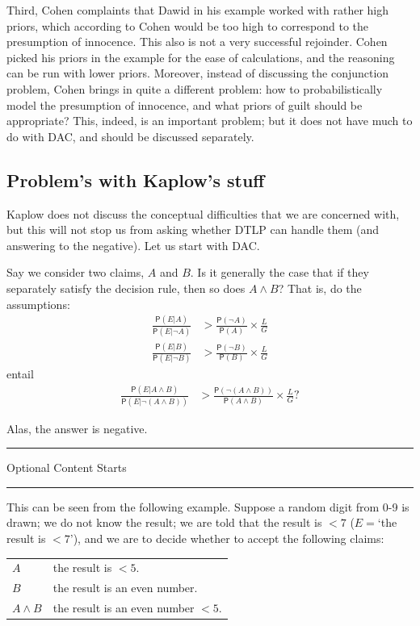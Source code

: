 \documentclass[
  10pt,
  dvipsnames,enabledeprecatedfontcommands]{scrartcl}
\newcommand{\n}{\neg}
\newcommand{\et}{\wedge}
\newcommand{\pr}[1]{\mathsf{P}(#1)}
\newcommand{\intermezzoa}{
	\begin{minipage}[c]{13cm}
	\begin{center}\rule{10cm}{0.4pt}



	\tiny{\sc Optional Content Starts}
	
	\vspace{-1mm}
	
	\rule{10cm}{0.4pt}\end{center}
	\end{minipage}\nopagebreak 
	}
\begin{document}
Third, Cohen complaints that Dawid in his example worked with rather
high priors, which according to Cohen would be too high to correspond to
the presumption of innocence. This also is not a very successful
rejoinder. Cohen picked his priors in the example for the ease of
calculations, and the reasoning can be run with lower priors. Moreover,
instead of discussing the conjunction problem, Cohen brings in quite a
different problem: how to probabilistically model the presumption of
innocence, and what priors of guilt should be appropriate? This, indeed,
is an important problem; but it does not have much to do with DAC, and
should be discussed separately.

\hypertarget{problems-with-kaplows-stuff}{%
\subsection{Problem's with Kaplow's
stuff}\label{problems-with-kaplows-stuff}}

Kaplow does not discuss the conceptual difficulties that we are
concerned with, but this will not stop us from asking whether DTLP can
handle them (and answering to the negative). Let us start with DAC.

Say we consider two claims, \(A\) and \(B\). Is it generally the case
that if they separately satisfy the decision rule, then so does
\(A\et B\)? That is, do the assumptions: \begin{align*}
 \frac{\pr{E\vert A}}{\pr{E\vert \n A}}  & > \frac{\pr{\n A}}{\pr{A}} \times \frac{L}{G}\\
 \frac{\pr{E\vert B}}{\pr{E\vert \n B}}  & > \frac{\pr{\n B}}{\pr{B}} \times \frac{L}{G}
 \end{align*} \noindent entail \begin{align*}
 \frac{\pr{E\vert A\et B}}{\pr{E\vert \n (A\et B)}}  & > \frac{\pr{\n (A\et B)}}{
 \pr{A\et B}} \times \frac{L}{G}?
 \end{align*}

Alas, the answer is negative.

\intermezzoa

This can be seen from the following example. Suppose a random digit from
0-9 is drawn; we do not know the result; we are told that the result is
\(<7\) (\(E=\)`the result is \(<7\)'), and we are to decide whether to
accept the following claims:

\begin{center}
 \begin{tabular}{@{}ll@{}}
 \toprule
 $A$ & the result is $<5$. \\
 $B$  & the result is an even number.\\
 $A\et B$ & the result is an even number $<5$. \\
 \bottomrule
 \end{tabular}
 \end{center}
\end{document}
